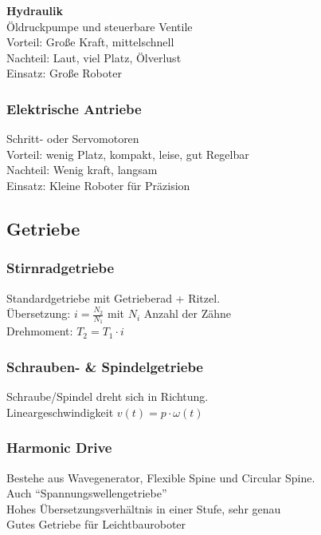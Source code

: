 \textbf{Hydraulik}\\
Öldruckpumpe und steuerbare Ventile\\
Vorteil: Große Kraft, mittelschnell\\
Nachteil: Laut, viel Platz, Ölverlust\\
Einsatz: Große Roboter

\subsubsection{Elektrische Antriebe}
Schritt- oder Servomotoren\\
Vorteil: wenig Platz, kompakt, leise, gut Regelbar\\
Nachteil: Wenig kraft, langsam\\
Einsatz: Kleine Roboter für Präzision

\subsection{Getriebe}
\subsubsection{Stirnradgetriebe}
Standardgetriebe mit Getrieberad + Ritzel.\\
Übersetzung: \(i = \frac{N_2}{N_1}\) mit \(N_i\) Anzahl der Zähne\\
Drehmoment: \(T_2 = T_1 \cdot i\)

\subsubsection{Schrauben- \& Spindelgetriebe}
Schraube/Spindel dreht sich in Richtung.\\
Lineargeschwindigkeit \(v(t) = p \cdot \omega(t)\)

\subsubsection{Harmonic Drive}
Bestehe aus Wavegenerator, Flexible Spine und Circular Spine.\\
Auch \enquote{Spannungswellengetriebe}\\
Hohes Übersetzungsverhältnis in einer Stufe, sehr genau\\
Gutes Getriebe für Leichtbauroboter
